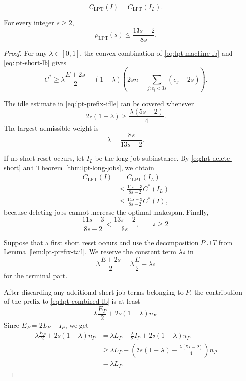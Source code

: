 \documentclass[10pt,a4paper]{amsart}
\begin{document}
\begin{equation}
C_{\mathrm{LPT}}(I)=C_{\mathrm{LPT}}(I_L).
\label{eq:lpt-delete-short}
\end{equation}

\begin{theorem}
\label{thm:lpt-unrestricted-upper}
For every integer \(s\ge2\),
\[
\boxed{
\rho_{\mathrm{LPT}}(s)
\le
\frac{13s-2}{8s}.
}
\]
\end{theorem}

\begin{proof}
For any \(\lambda\in[0,1]\), the convex combination of
\eqref{eq:lpt-machine-lb} and \eqref{eq:lpt-short-lb} gives
\begin{equation}
C^*
\ge
\lambda\frac{E+2s}{2}
+
(1-\lambda)
\left(
2sn+\sum_{j:e_j<3s}(e_j-2s)
\right).
\label{eq:lpt-combined-lb}
\end{equation}

The idle estimate in \eqref{eq:lpt-prefix-idle} can be covered whenever
\[
2s(1-\lambda)
\ge
\frac{\lambda(5s-2)}{4}.
\]
The largest admissible weight is
\begin{equation}
\lambda=\frac{8s}{13s-2}.
\label{eq:lpt-weight}
\end{equation}

If no short reset occurs, let \(I_L\) be the long-job subinstance. By
\eqref{eq:lpt-delete-short} and Theorem~\ref{thm:lpt-long-jobs}, we obtain 
\[
\begin{aligned}
C_{\mathrm{LPT}}(I)
&=C_{\mathrm{LPT}}(I_L)\\
&\le\frac{11s-3}{8s-2}C^*(I_L)\\
&\le\frac{11s-3}{8s-2}C^*(I),
\end{aligned}
\]
because deleting jobs cannot increase the optimal makespan. Finally,
\[
\frac{11s-3}{8s-2}<\frac{13s-2}{8s},
\qquad s\ge2.
\]

Suppose that a first short reset occurs and use the decomposition \(P\cup T\)
from Lemma~\ref{lem:lpt-prefix-tail}. We reserve the constant term
\(\lambda s\) in
\[
\lambda\frac{E+2s}{2}=\lambda\frac E2+\lambda s
\]
for the terminal part.

After discarding any additional short-job terms belonging to \(P\), the
contribution of the prefix to \eqref{eq:lpt-combined-lb} is at least
\[
\lambda\frac{E_P}{2}+2s(1-\lambda)n_P.
\]
Since \(E_P=2L_P-I_P\), we get 
\begin{equation}
\begin{aligned}
\lambda\frac{E_P}{2}+2s(1-\lambda)n_P
&=\lambda L_P-\frac{\lambda}{2}I_P
  +2s(1-\lambda)n_P\\
&\ge
\lambda L_P+
\left(
2s(1-\lambda)-\frac{\lambda(5s-2)}4
\right)n_P\\
&=\lambda L_P.
\end{aligned}
\label{eq:lpt-prefix-payment}
\end{equation}


\end{proof}
\end{document}
